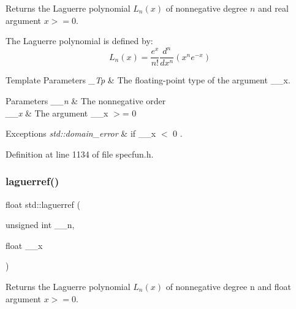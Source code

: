 Returns the Laguerre polynomial $ L_n(x) $ of nonnegative degree $ n $ and real argument $ x >= 0 $.

The Laguerre polynomial is defined by\+: \[ L_n(x) = \frac{e^x}{n!} \frac{d^n}{dx^n} (x^ne^{-x}) \]


\begin{DoxyTemplParams}{Template Parameters}
{\em \+\_\+\+Tp} & The floating-\/point type of the argument {\ttfamily \+\_\+\+\_\+x}. \\
\hline
\end{DoxyTemplParams}

\begin{DoxyParams}{Parameters}
{\em \+\_\+\+\_\+n} & The nonnegative order \\
\hline
{\em \+\_\+\+\_\+x} & The argument {\ttfamily  \+\_\+\+\_\+x $>$= 0 } \\
\hline
\end{DoxyParams}

\begin{DoxyExceptions}{Exceptions}
{\em std\+::domain\+\_\+error} & if {\ttfamily  \+\_\+\+\_\+x $<$ 0 }. \\
\hline
\end{DoxyExceptions}


Definition at line 1134 of file specfun.\+h.

\mbox{\label{group__tr29124__math__spec__func_gada763419b0e21b38e38daa8b6eb56a8c}} 
\subsubsection{\texorpdfstring{laguerref()}{laguerref()}}
{\footnotesize\ttfamily float std\+::laguerref (\begin{DoxyParamCaption}\item[{unsigned int}]{\+\_\+\+\_\+n,  }\item[{float}]{\+\_\+\+\_\+x }\end{DoxyParamCaption})\hspace{0.3cm}{\ttfamily [inline]}}

Returns the Laguerre polynomial $ L_n(x) $ of nonnegative degree {\ttfamily n} and {\ttfamily float} argument $ x >= 0 $.

